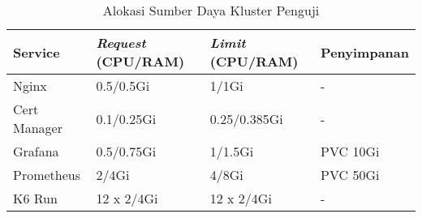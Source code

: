 \begin{table}[htbp]
    \centering
    \caption{Alokasi Sumber Daya Kluster Penguji}
    \label{tab:test-cluster-allocation}
    \begin{tabular}{|l|l|l|l|}
        \hline
        \textbf{Service} & \textbf{\textit{Request} (CPU/RAM)} & \textbf{\textit{Limit} (CPU/RAM)} & \textbf{Penyimpanan} \\ \hline
        Nginx            & 0.5/0.5Gi                           & 1/1Gi                             & -                    \\ \hline
        Cert Manager     & 0.1/0.25Gi                          & 0.25/0.385Gi                      & -                    \\ \hline
        Grafana          & 0.5/0.75Gi                          & 1/1.5Gi                           & PVC 10Gi             \\ \hline
        Prometheus       & 2/4Gi                               & 4/8Gi                             & PVC 50Gi             \\ \hline
        K6 Run           & 12 x 2/4Gi                          & 12 x 2/4Gi                        & -                    \\ \hline
    \end{tabular}
\end{table}


